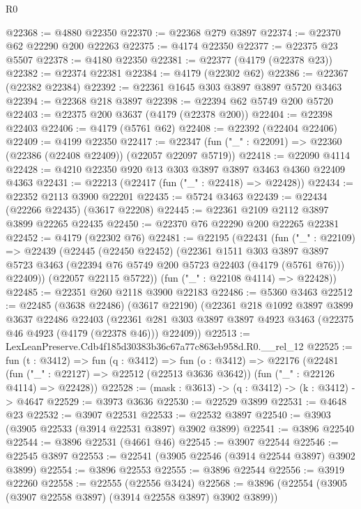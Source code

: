 \begin{lexlean}{R0}
\begin{coremodule}
@22368 := @4880 @22350
@22370 := @22368 @279 @3897
@22374 := @22370 @62 @22290 @200 @22263
@22375 := @4174 @22350
@22377 := @22375 @23 @5507
@22378 := @4180 @22350
@22381 := @22377 (@4179 (@22378 @23))
@22382 := @22374 @22381
@22384 := @4179 (@22302 @62)
@22386 := @22367 (@22382 @22384)
@22392 := @22361 @1645 @303 @3897 @3897 @5720 @3463
@22394 := @22368 @218 @3897
@22398 := @22394 @62 @5749 @200 @5720
@22403 := @22375 @200 @3637 (@4179 (@22378 @200))
@22404 := @22398 @22403
@22406 := @4179 (@5761 @62)
@22408 := @22392 (@22404 @22406)
@22409 := @4199 @22350
@22417 := @22347 (fun ("_" : @22091) => @22360 (@22386 (@22408 @22409)) (@22057 @22097 @5719))
@22418 := @22090 @4114
@22428 := @4210 @22350 @920 @13 @303 @3897 @3897 @3463 @4360 @22409 @4363
@22431 := @22213 (@22417 (fun ("_" : @22418) => @22428))
@22434 := @22352 @2113 @3900 @22201
@22435 := @5724 @3463
@22439 := @22434 (@22266 @22435) (@3617 @22208)
@22445 := @22361 @2109 @2112 @3897 @3899 @22265 @22435
@22450 := @22370 @76 @22290 @200 @22265 @22381
@22452 := @4179 (@22302 @76)
@22481 := @22195
    (@22431
      (fun ("_" : @22109) =>
      @22439
        (@22445
          (@22450 @22452)
          (@22361
            @1511
            @303
            @3897
            @3897
            @5723
            @3463
            (@22394 @76 @5749 @200 @5723 @22403 (@4179 (@5761 @76)))
            @22409))
        (@22057 @22115 @5722))
      (fun ("_" : @22108 @4114) => @22428))
@22485 := @22351 @260 @2118 @3900 @22183
@22486 := @5360 @3463
@22512 := @22485
    (@3638 @22486)
    (@3617 @22190)
    (@22361
      @218
      @1092
      @3897
      @3899
      @3637
      @22486
      @22403
      (@22361 @281 @303 @3897 @3897 @4923 @3463 (@22375 @46 @4923 (@4179 (@22378 @46))) @22409))
@22513 := LexLeanPreserve.Cdb4f185d30383b36c67a77c863eb958d.R0.__rel_12
@22525 := fun (t : @3412) =>
  fun (q : @3412) =>
  fun (o : @3412) =>
  @22176
    (@22481
      (fun ("_" : @22127) => @22512 (@22513 @3636 @3642))
      (fun ("_" : @22126 @4114) => @22428))
@22528 := (mask : @3613) -> (q : @3412) -> (k : @3412) -> @4647
@22529 := @3973 @3636
@22530 := @22529 @3899
@22531 := @4648 @23
@22532 := @3907 @22531
@22533 := @22532 @3897
@22540 := @3903 (@3905 @22533 (@3914 @22531 @3897) @3902 @3899)
@22541 := @3896 @22540
@22544 := @3896 @22531 (@4661 @46)
@22545 := @3907 @22544
@22546 := @22545 @3897
@22553 := @22541 (@3905 @22546 (@3914 @22544 @3897) @3902 @3899)
@22554 := @3896 @22553
@22555 := @3896 @22544
@22556 := @3919 @22260
@22558 := @22555 (@22556 @3424)
@22568 := @3896 (@22554 (@3905 (@3907 @22558 @3897) (@3914 @22558 @3897) @3902 @3899))

\end{coremodule}
\end{lexlean}

